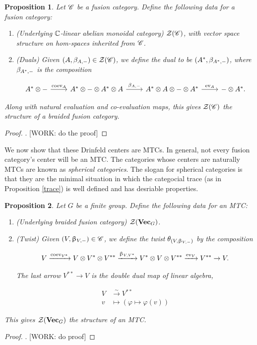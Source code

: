 \documentclass{article}
\newtheorem{proposition}{Proposition}[section]
\theoremstyle{definition}
\numberwithin{figure}{section}
\begin{document}
\begin{proposition} Let $\mathscr{C}$ be a fusion category. Define the following data for a fusion category:

\begin{enumerate}
\item (Underlying $\mathbb{C}$-linear abelian monoidal category) $\mathcal{Z}(\mathscr{C})$, with vector space structure on hom-spaces inherited from $\mathscr{C}$.

\item (Duals) Given $(A,\beta_{A,\--})\in \mathcal{Z}(\mathscr{C})$, we define the dual to be $(A^*,\beta_{A^*,\--})$, where $\beta_{A^*,\--}$ is the composition

\[\begin{tikzcd}
	{A^*\otimes \--} & {A^*\otimes \-- \otimes A^*\otimes A} & {A^*\otimes A\otimes \-- \otimes A^*} & {\--\otimes A^*}.
	\arrow["{\coev_{A}}", from=1-1, to=1-2]
	\arrow["{\beta_{A,\--}}", from=1-2, to=1-3]
	\arrow["{\ev_A}", from=1-3, to=1-4]
\end{tikzcd}\]
\end{enumerate}

Along with natural evaluation and co-evaluation maps, this gives $\mathcal{Z}(\mathscr{C})$ the structure of a braided fusion category.
\end{proposition}
\begin{proof}. [WORK: do the proof]
\end{proof}

We now show that these Drinfeld centers are MTCs. In general, not every fusion category's center will be an MTC. The categories whose centers are naturally MTCs are known as \textit{spherical categories}. The slogan for spherical categories is that they are the minimal situation in which the categocial trace (as in Proposition \ref{trace}) is well defined and has desriable properties.

\begin{proposition} Let $G$ be a finite group. Define the following data for an MTC:

\begin{enumerate}
\item (Underlying braided fusion category) $\mathcal{Z}(\bold{Vec}_G)$.
\item (Twist) Given $(V,\upbeta_{V,\--})\in \mathscr{C}$, we define the twist $\theta_{(V,\upbeta_{V,\--})}$ by the composition

$$V\xrightarrow{\mathrm{coev}_{V^*}} V\otimes V^*\otimes V^{**}\xrightarrow{\upbeta_{V,V^*}} V^*\otimes V \otimes V^{**}\xrightarrow{\mathrm{ev}_{V}} V^{**}\to V.$$

The last arrow $V^{**}\to V$ is the double dual map of linear algebra,

\begin{align*}
V&\xrightarrow{\sim} V^{**}\\
v&\mapsto (\varphi \mapsto \varphi(v))
\end{align*}
\end{enumerate}

This gives $\mathcal{Z}(\bold{Vec}_G)$ the structure of an MTC.
\end{proposition}
\begin{proof}. [WORK: do proof]
\end{proof}
\end{document}
